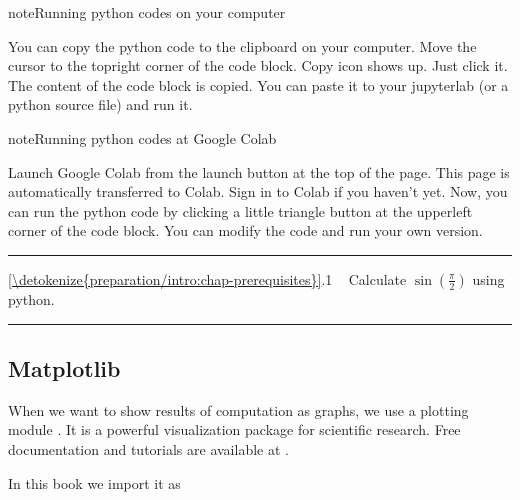 \documentclass[letterpaper,10pt,english]{jupyterBook}
\begin{document}
\begin{sphinxadmonition}{note}{Running python codes on your computer}

\sphinxAtStartPar
You can copy the python code to the clipboard on your computer.  Move the cursor to the top\sphinxhyphen{}right corner of the code block.  Copy icon shows up.  Just click it.  The content of the code block is copied.  You can paste it to your jupyter\sphinxhyphen{}lab (or a python source file) and run it.
\end{sphinxadmonition}

\begin{sphinxadmonition}{note}{Running python codes at Google Colab}

\sphinxAtStartPar
Launch Google Colab from the launch button at the top of the page.  This page is automatically transferred to Colab.  Sign in to Colab if you haven’t yet.  Now, you can run the python code by clicking a little triangle button at the upper\sphinxhyphen{}left corner of the code block.  You can modify the code and run your own version.
\end{sphinxadmonition}


\bigskip\hrule\bigskip


\sphinxAtStartPar
{} \hyperref[\detokenize{preparation/intro:chap-prerequisites}]{\ref{\detokenize{preparation/intro:chap-prerequisites}}}.1   Calculate \(\sin\left(\frac{\pi}{2}\right)\) using python.


\bigskip\hrule\bigskip



\subsection{Matplotlib}
\label{\detokenize{preparation/python:matplotlib}}
\sphinxAtStartPar
When we want to show results of computation as graphs, we use a plotting module .  It is a powerful visualization package for scientific research.  Free documentation and tutorials are available at
.

\sphinxAtStartPar
In this book we import it as

\begin{sphinxVerbatim}[commandchars=\\\{\}]
   
\end{sphinxVerbatim}
\end{document}
